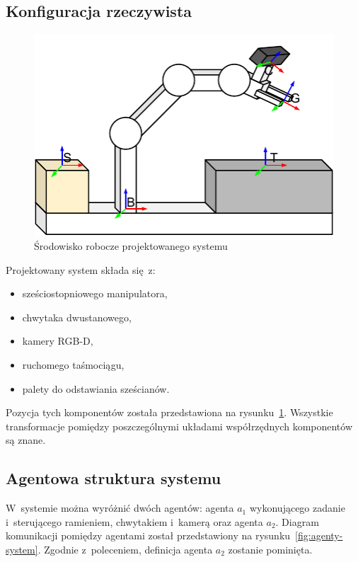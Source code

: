 \subsection{Konfiguracja rzeczywista}
\label{subsec:konfiguracja-urzadzen}

\begin{figure}
    \centering
    \includegraphics[width=\columnwidth]{figures/ISR-system-overview.pdf}
    \caption{Środowisko robocze projektowanego systemu}
    \label{fig:srodowisko-robocze}
\end{figure}

Projektowany system składa się z:\begin{itemize}
    \item sześciostopniowego manipulatora,
    \item chwytaka dwustanowego,
    \item kamery RGB-D,
    \item ruchomego taśmociągu,
    \item palety do odstawiania sześcianów.
\end{itemize}

Pozycja tych komponentów została przedstawiona na rysunku~\ref{fig:srodowisko-robocze}. Wszystkie transformacje pomiędzy poszczególnymi układami współrzędnych komponentów są znane.

\subsection{Agentowa struktura systemu}
\label{subsec:agentowa-struktura}

W~systemie można wyróżnić dwóch agentów: agenta $a_{1}$ wykonującego zadanie i~sterującego ramieniem, chwytakiem i~kamerą oraz agenta $a_{2}$.  Diagram komunikacji pomiędzy agentami został przedstawiony na rysunku~\ref{fig:agenty-system}. Zgodnie z~poleceniem, definicja agenta $a_{2}$ zostanie pominięta.

